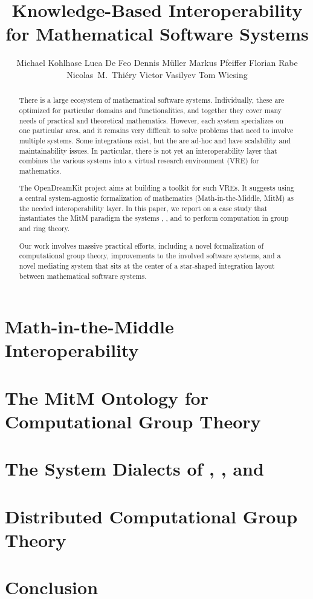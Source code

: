 \documentclass{llncs}
\title{Knowledge-Based Interoperability for Mathematical Software Systems}
\author{
Michael Kohlhase\inst{1}
Luca De Feo\inst{5}
Dennis M\"uller\inst{1} 
Markus Pfeiffer\inst{3} 
Florian Rabe\inst{2} 
Nicolas~M.~Thiéry\inst{4} 
Victor Vasilyev\inst{3} 
Tom Wiesing\inst{1}
}
\institute{
   FAU Erlangen-N\"urnberg
   \and Jacobs University Bremen
   \and University of St~Andrews 
   \and Universit\'e Paris-Sud
   \and Universit\'e Versailles St Quentin
}
\begin{document}
\maketitle
\begin{abstract}
  There is a large ecosystem of mathematical software systems.
  Individually, these are optimized for particular domains and functionalities, and together they cover many needs of practical and theoretical mathematics.
  However, each system specializes on one particular area, and it remains very difficult to solve problems that need to involve multiple systems.
  Some integrations exist, but the are ad-hoc and have scalability and maintainability issues.
  In particular, there is not yet an interoperability layer that combines the various systems into a virtual research environment (VRE) for
  mathematics.
  
  The OpenDreamKit project aims at building a toolkit for such VREs.
  It suggests using a central system-agnostic formalization of mathematics (Math-in-the-Middle, MitM) as the needed interoperability layer.
  In this paper, we report on  a case study that instantiates the MitM paradigm the
  systems \GAP, \Sage, and \Singular to perform computation in group and ring theory.
 
  Our work involves massive practical efforts, including a novel formalization of computational group theory, improvements to the involved software systems, and a novel mediating system that sits at the center of a star-shaped integration layout between mathematical software systems.
\end{abstract}


\section{Math-in-the-Middle Interoperability}\label{sec:mitm}


\section{The MitM Ontology for Computational Group Theory}\label{sec:cgt}


\section{The System Dialects of \GAP, \Sage, and \Singular}\label{sec:apit}


\section{Distributed Computational Group Theory}\label{sec:case}


\section{Conclusion}\label{sec:concl}
  
  
\printbibliography
\newpage
% 
\end{document}
